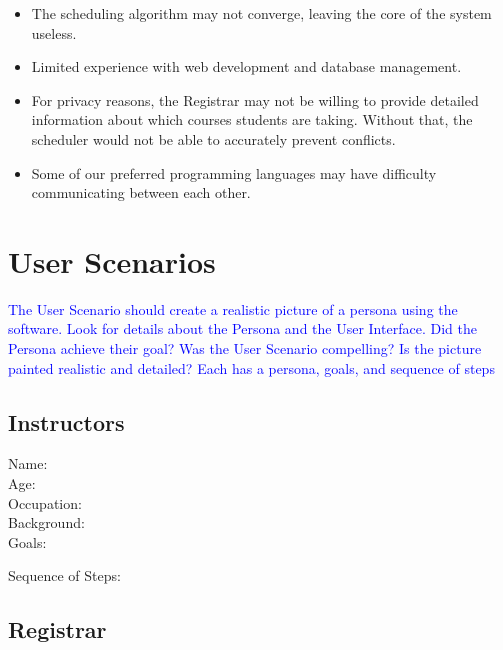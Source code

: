 \documentclass[11pt]{article}
\begin{document}
\begin{itemize}
\item The scheduling algorithm may not converge, leaving the core of the system useless.
\item Limited experience with web development and database management.
\item For privacy reasons, the Registrar may not be willing to provide detailed information about which courses students are taking. Without that, the scheduler would not be able to accurately prevent conflicts.
\item Some of our preferred programming languages may have difficulty communicating between each other. %
\end{itemize}


\section{User Scenarios}  %
\textcolor{blue}{The User Scenario should create a realistic picture of a persona using the software.  
Look for details about the Persona and the User Interface.  
Did the Persona achieve their goal?  
Was the User Scenario compelling?  
Is the picture painted realistic and detailed?
Each has a persona, goals, and sequence of steps}
\subsection{Instructors} %
\begin{description}
\item[Name:]
\item[Age:]
\item[Occupation:]
\item[Background:]

\item[Goals:]
\begin{enumerate}
\end{enumerate}

\item[Sequence of Steps:]
\end{description}


\subsection{Registrar}  %
\end{document}
